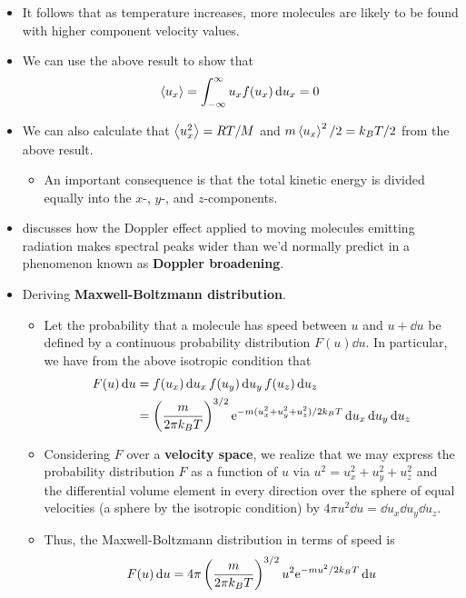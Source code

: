 \documentclass[../notes.tex]{subfiles}
\begin{document}
\begin{itemize}
\begin{itemize}
    \end{itemize}
    \item It follows that as temperature increases, more molecules are likely to be found with higher component velocity values.
    \item We can use the above result to show that
    \begin{equation*}
        \prb{u_x} = \int_{-\infty}^\infty u_xf(u_x)\dd{u_x} = 0
    \end{equation*}
    \item We can also calculate that $\prb{u_x^2}=RT/M$ and $m\prb{u_x}^2/2=k_BT/2$ from the above result.
    \begin{itemize}
        \item An important consequence is that the total kinetic energy is divided equally into the $x$-, $y$-, and $z$-components.
    \end{itemize}
    \item \textcite{bib:McQuarrieSimon} discusses how the Doppler effect applied to moving molecules emitting radiation makes spectral peaks wider than we'd normally predict in a phenomenon known as \textbf{Doppler broadening}.
    \item Deriving \textbf{Maxwell-Boltzmann distribution}.
    \begin{itemize}
        \item Let the probability that a molecule has speed between $u$ and $u+\dd{u}$ be defined by a continuous probability distribution $F(u)\dd{u}$. In particular, we have from the above isotropic condition that
        \begin{align*}
            F(u)\dd{u} &= f(u_x)\dd{u_x}f(u_y)\dd{u_y}f(u_z)\dd{u_z}\\
            &= \left( \frac{m}{2\pi k_BT} \right)^{3/2}\e[-m(u_x^2+u_y^2+u_z^2)/2k_BT]\dd{u_x}\dd{u_y}\dd{u_z}
        \end{align*}
        \item Considering $F$ over a \textbf{velocity space}, we realize that we may express the probability distribution $F$ as a function of $u$ via $u^2=u_x^2+u_y^2+u_z^2$ and the differential volume element in every direction over the sphere of equal velocities (a sphere by the isotropic condition) by $4\pi u^2\dd{u}=\dd{u_x}\dd{u_y}\dd{u_z}$.
        \item Thus, the Maxwell-Boltzmann distribution in terms of speed is
        \begin{equation*}
            F(u)\dd{u} = 4\pi\left( \frac{m}{2\pi k_BT} \right)^{3/2}u^2\e[-mu^2/2k_BT]\dd{u}

\end{equation*}
\end{itemize}
\end{itemize}
\end{document}
